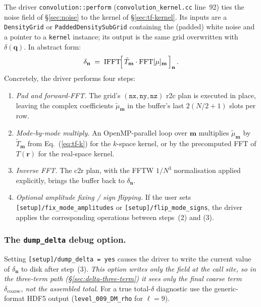 \documentclass[12pt]{article}
\newcommand{\bq}{\mathbf{q}}
\newcommand{\bn}{\mathbf{n}}
\newcommand{\bm}{\mathbf{m}}
\newcommand{\br}{\mathbf{r}}
\newcommand{\code}[1]{\texttt{#1}}
\begin{document}
The driver \code{convolution::perform} (\code{convolution\_kernel.cc}
line~92) ties the noise field of \S\ref{sec:noise} to the kernel of
\S\ref{sec:tf-kernel}.  Its inputs are a \code{DensityGrid} or
\code{PaddedDensitySubGrid} containing the (padded) white noise and
a pointer to a \code{kernel} instance; its output is the same grid
overwritten with $\delta(\bq)$.  In abstract form:
\begin{equation}
  \delta_\bn \;=\; \mathrm{IFFT}\!\Bigl[\,\tilde T_\bm \cdot
                  \mathrm{FFT}[\mu]_\bm\,\Bigr]_\bn\,.
  \label{eq:driver-abstract}
\end{equation}
Concretely, the driver performs four steps:
\begin{enumerate}
  \item \emph{Pad and forward-FFT.}  The grid's $(\code{nx}, \code{ny}, \code{nz})$
        r2c plan is executed in place, leaving the complex
        coefficients $\tilde\mu_\bm$ in the buffer's last
        $2(N/2{+}1)$ slots per row.
  \item \emph{Mode-by-mode multiply.}  An OpenMP-parallel loop over
        $\bm$ multiplies $\tilde\mu_\bm$ by $\tilde T_\bm$ from
        Eq.~(\ref{eq:tf-k}) for the $k$-space kernel, or by the
        precomputed FFT of $T(\br)$ for the real-space kernel.
  \item \emph{Inverse FFT.}  The c2r plan, with the FFTW $1/N^3$
        normalisation applied explicitly, brings the buffer back to
        $\delta_\bn$.
  \item \emph{Optional amplitude fixing / sign flipping.}  If the
        user sets \code{[setup]/fix\_mode\_amplitudes} or
        \code{[setup]/flip\_mode\_signs}, the driver applies the
        corresponding operations between steps~(2) and (3).
\end{enumerate}

\subsubsection*{The \texttt{dump\_delta} debug option.}
Setting \code{[setup]/dump\_delta = yes} causes the driver to
write the current value of $\delta_\bn$ to disk after step~(3).
\emph{This option writes only the field at the call site, so in the
three-term path (\S\ref{sec:delta-three-term}) it sees only the
final coarse term $\delta_\mathrm{coarse}$, not the assembled total.}
For a true total-$\delta$ diagnostic use the generic-format HDF5
output (\code{level\_009\_DM\_rho} for $\ell = 9$).
\end{document}
